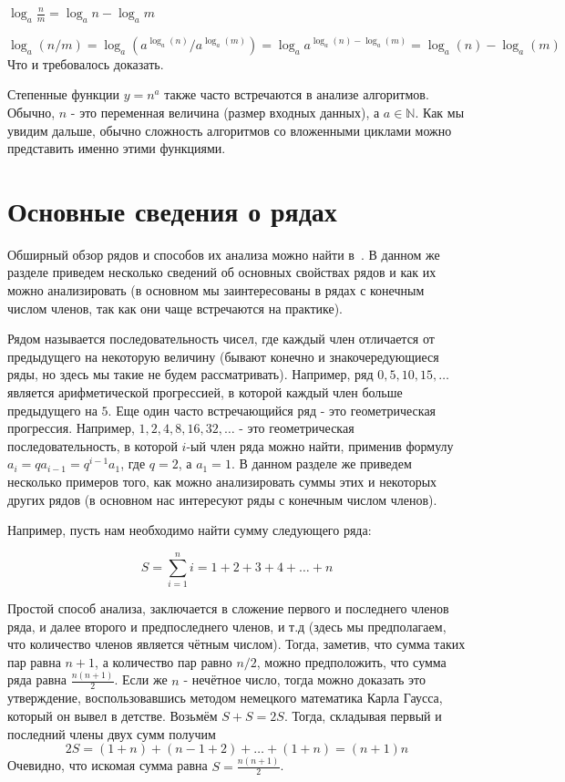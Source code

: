 \begin{theorem}
$\log_a\frac{n}{m}=\log_an-\log_am$
\end{theorem}
$\log_a(n/m)=\log_a(a^{\log_a(n)}/a^{\log_a(m)})=\log_aa^{\log_a(n)-\log_a(m)}=\log_a(n)-\log_a(m)$
Что и требовалось доказать.

Степенные функции $y=n^a$ также часто встречаются в анализе алгоритмов. Обычно, $n$ - это
переменная величина (размер входных данных), а $a \in \mathbb{N}$. Как мы увидим дальше,
обычно сложность алгоритмов со вложенными циклами можно представить именно этими функциями.

\section{Основные сведения о рядах}

Обширный обзор рядов и способов их анализа можно 
найти в~\cite{kudryavcev:math, stewart:calculus}. В данном же разделе 
приведем несколько сведений об основных свойствах рядов и 
как их можно анализировать (в основном мы заинтересованы в рядах с
конечным числом членов, так как они чаще встречаются на практике). 

Рядом называется последовательность чисел, где каждый член отличается от предыдущего 
на некоторую величину (бывают конечно и знакочередующиеся ряды, но
здесь мы такие не будем рассматривать). Например, ряд $0, 5, 10, 15, \ldots$ является 
арифметической прогрессией, в которой каждый член больше предыдущего на $5$. 
Еще один часто встречающийся ряд - это геометрическая прогрессия. 
Например, $1, 2, 4, 8, 16, 32, \ldots$ - это геометрическая 
последовательность, в которой $i$-ый член ряда можно найти, 
применив формулу $a_i = qa_{i-1} = q^{i-1}a_{1}$, где $q=2$, а $a_1 = 1$. В данном разделе
же приведем несколько примеров того, как можно анализировать суммы этих 
и некоторых других рядов (в основном нас интересуют ряды с конечным числом членов).

Например, пусть нам необходимо найти сумму следующего ряда:

$$S=\sum_{i=1}^{n}i = 1 + 2 + 3 + 4 + \ldots + n$$

Простой способ анализа, заключается в сложение первого и последнего членов ряда, и далее 
второго и предпоследнего членов, и т.д (здесь мы предполагаем, что количество членов 
является чётным числом). Тогда, заметив, что сумма таких пар равна $n+1$,
а количество пар равно $n/2$, можно предположить, что сумма ряда равна $\frac{n(n+1)}{2}$.
Если же $n$ - нечётное число, тогда можно доказать это утверждение, воспользовавшись методом немецкого 
математика Карла Гаусса, который он вывел в детстве. Возьмём $S+S=2S$. Тогда,
складывая первый и последний члены двух сумм получим 
$$2S=(1+n) + (n - 1 + 2) + \ldots + (1 + n) = (n+1)n$$
Очевидно, что искомая сумма равна $S=\frac{n(n+1)}{2}$.

